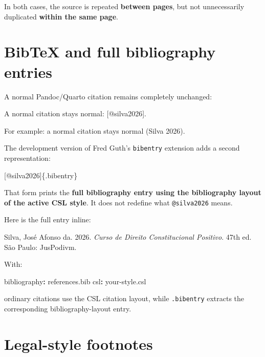 \documentclass[
  letterpaper,
  DIV=11,
  numbers=noendperiod]{scrartcl}
\newenvironment{Shaded}{\begin{snugshade}}{\end{snugshade}}
\newcommand{\AttributeTok}[1]{\textcolor[rgb]{0.40,0.45,0.13}{#1}}
\newcommand{\FunctionTok}[1]{\textcolor[rgb]{0.28,0.35,0.67}{#1}}
\newcommand{\KeywordTok}[1]{\textcolor[rgb]{0.00,0.23,0.31}{\textbf{#1}}}
\newcommand{\NormalTok}[1]{\textcolor[rgb]{0.00,0.23,0.31}{#1}}
\begin{document}
In both cases, the source is repeated \textbf{between pages}, but not
unnecessarily duplicated \textbf{within the same page}.

\section{BibTeX and full bibliography
entries}\label{bibtex-and-full-bibliography-entries}

A normal Pandoc/Quarto citation remains completely unchanged:

\begin{Shaded}
\begin{Highlighting}[]
\NormalTok{A normal citation stays normal: [@silva2026].}
\end{Highlighting}
\end{Shaded}

For example: a normal citation stays normal (Silva 2026).

The development version of Fred Guth's \texttt{bibentry} extension adds
a second representation:

\begin{Shaded}
\begin{Highlighting}[]
\NormalTok{[@silva2026]\{.bibentry\}}
\end{Highlighting}
\end{Shaded}

That form prints the \textbf{full bibliography entry using the
bibliography layout of the active CSL style}. It does not redefine what
\texttt{@silva2026} means.

Here is the full entry inline:

Silva, José Afonso da. 2026. \emph{Curso de Direito Constitucional
Positivo}. 47th ed. São Paulo: JusPodivm.

With:

\begin{Shaded}
\begin{Highlighting}[]
\FunctionTok{bibliography}\KeywordTok{:}\AttributeTok{ references.bib}
\FunctionTok{csl}\KeywordTok{:}\AttributeTok{ your{-}style.csl}
\end{Highlighting}
\end{Shaded}

ordinary citations use the CSL citation layout, while \texttt{.bibentry}
extracts the corresponding bibliography-layout entry.

\section{Legal-style footnotes}\label{legal-style-footnotes}
\end{document}
